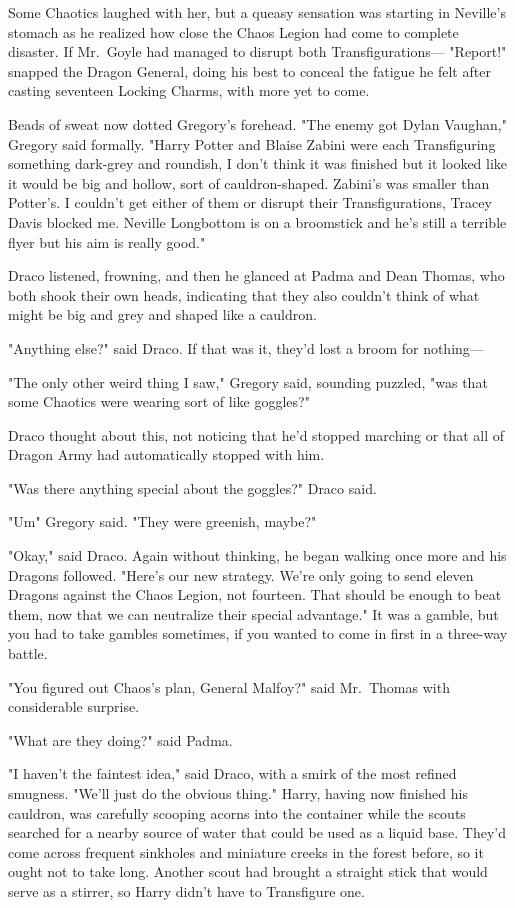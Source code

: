 Some Chaotics laughed with her, but a queasy sensation was starting in
Neville's stomach as he realized how close the Chaos Legion had come to
complete disaster. If Mr.~Goyle had managed to disrupt both Transfigurations---
\sbreak
"Report!" snapped the Dragon General, doing his best to conceal the fatigue he
felt after casting seventeen Locking Charms, with more yet to come.

Beads of sweat now dotted Gregory's forehead. "The enemy got Dylan Vaughan,"
Gregory said formally. "Harry Potter and Blaise Zabini were each Transfiguring
something dark-grey and roundish, I don't think it was finished but it looked
like it would be big and hollow, sort of cauldron-shaped. Zabini's was smaller
than Potter's. I couldn't get either of them or disrupt their Transfigurations,
Tracey Davis blocked me. Neville Longbottom is on a broomstick and he's still a
terrible flyer but his aim is really good."

Draco listened, frowning, and then he glanced at Padma and Dean Thomas, who
both shook their own heads, indicating that they also couldn't think of what
might be big and grey and shaped like a cauldron.

"Anything else?" said Draco. If that was it, they'd lost a broom for nothing---

"The only other weird thing I saw," Gregory said, sounding puzzled, "was that
some Chaotics were wearing{\el} sort of like goggles?"

Draco thought about this, not noticing that he'd stopped marching or that all
of Dragon Army had automatically stopped with him.

"Was there anything special about the goggles?" Draco said.

"Um{\el}" Gregory said. "They were{\el} greenish, maybe?"

"Okay," said Draco. Again without thinking, he began walking once more and his
Dragons followed. "Here's our new strategy. We're only going to send eleven
Dragons against the Chaos Legion, not fourteen. That should be enough to beat
them, now that we can neutralize their special advantage." It was a gamble, but
you had to take gambles sometimes, if you wanted to come in first in a
three-way battle.

"You figured out Chaos's plan, General Malfoy?" said Mr.~Thomas with
considerable surprise.

"What are they doing?" said Padma.

"I haven't the faintest idea," said Draco, with a smirk of the most refined
smugness. "We'll just do the obvious thing."
\sbreak
Harry, having now finished his cauldron, was carefully scooping acorns into the
container while the scouts searched for a nearby source of water that could be
used as a liquid base. They'd come across frequent sinkholes and miniature
creeks in the forest before, so it ought not to take long. Another scout had
brought a straight stick that would serve as a stirrer, so Harry didn't have to
Transfigure one.

